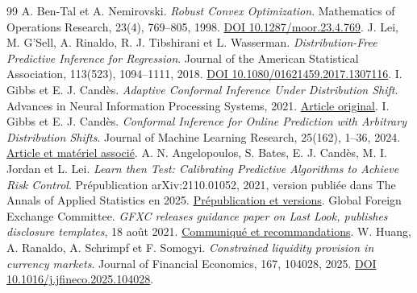 \clearpage
\renewcommand{\refname}{Références du complément}
\begin{thebibliography}{99}
\setcounter{enumiv}{23}
A. Ben-Tal et A. Nemirovski. \emph{Robust Convex Optimization}. Mathematics of Operations Research, 23(4), 769--805, 1998.
\href{https://doi.org/10.1287/moor.23.4.769}{DOI 10.1287/moor.23.4.769}.
J. Lei, M. G'Sell, A. Rinaldo, R. J. Tibshirani et L. Wasserman.
\emph{Distribution-Free Predictive Inference for Regression}. Journal of the American Statistical Association, 113(523), 1094--1111, 2018.
\href{https://doi.org/10.1080/01621459.2017.1307116}{DOI 10.1080/01621459.2017.1307116}.
I. Gibbs et E. J. Candès. \emph{Adaptive Conformal Inference Under Distribution Shift}. Advances in Neural Information Processing Systems, 2021.
\href{https://proceedings.neurips.cc/paper_files/paper/2021/file/0d441de75945e5acbc865406fc9a2559-Paper.pdf}{Article original}.
I. Gibbs et E. J. Candès. \emph{Conformal Inference for Online Prediction with Arbitrary Distribution Shifts}. Journal of Machine Learning Research, 25(162), 1--36, 2024.
\href{https://www.jmlr.org/papers/v25/22-1218.html}{Article et matériel associé}.
A. N. Angelopoulos, S. Bates, E. J. Candès, M. I. Jordan et L. Lei.
\emph{Learn then Test: Calibrating Predictive Algorithms to Achieve Risk Control}.
Prépublication arXiv:2110.01052, 2021, version publiée dans The Annals of Applied Statistics en 2025.
\href{https://arxiv.org/abs/2110.01052}{Prépublication et versions}.
Global Foreign Exchange Committee. \emph{GFXC releases guidance paper on Last Look, publishes disclosure templates}, 18 août 2021.
\href{https://www.globalfxc.org/press-releases/press-p210818/}{Communiqué et recommandations}.
W. Huang, A. Ranaldo, A. Schrimpf et F. Somogyi.
\emph{Constrained liquidity provision in currency markets}. Journal of Financial Economics, 167, 104028, 2025.
\href{https://doi.org/10.1016/j.jfineco.2025.104028}{DOI 10.1016/j.jfineco.2025.104028}.
\end{thebibliography}
